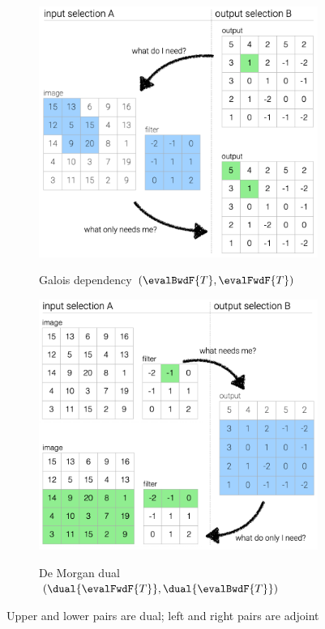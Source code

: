 \begin{figure}
   \begin{subfigure}{0.53\textwidth}
      {\includegraphics[scale=0.39]{fig/example/4-relations-1.png}}
      \vspace{2mm}
      \caption{Galois dependency $(\evalBwdF{T}, \evalFwdF{T})$}
      \label{fig:example:convolve-viz:galois-dependency}
   \end{subfigure}
   \begin{subfigure}{0.46\textwidth}
      {\includegraphics[scale=0.39]{fig/example/4-relations-2.png}}
      \vspace{2mm}
      \caption{De Morgan dual $(\dual{\evalFwdF{T}}, \dual{\evalBwdF{T}})$}
      \label{fig:example:convolve-viz:de-morgan-dual}
   \end{subfigure}
   \caption{Upper and lower pairs are dual; left and right pairs are adjoint}
   \label{fig:example:convolve-viz}
\end{figure}
